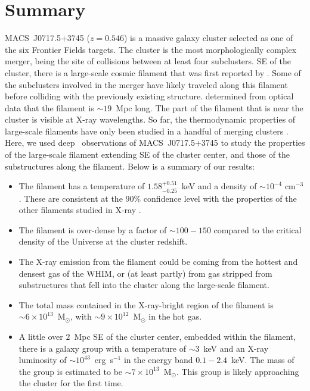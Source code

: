 \section{Summary}
\label{sec:Summary}

MACS~J0717.5+3745 ($z=0.546$) is a massive galaxy cluster selected as one of the six Frontier Fields targets. The cluster is the most morphologically complex merger, being the site of collisions between at least four subclusters. SE of the cluster, there is a large-scale cosmic filament that was first reported by \citet{Ebeling2004}. Some of the subclusters involved in the merger have likely traveled along this filament before colliding with the previously existing structure. \citet{Jauzac2012} determined from optical data that the filament is $\sim 19$~Mpc long. The part of the filament that is near the cluster is visible at X-ray wavelengths. So far, the thermodynamic properties of large-scale filaments have only been studied in a handful of merging clusters \citep{Werner2008, Eckert2015, Bulbul2016}. Here, we used deep \chandra\ observations of MACS~J0717.5+3745 to study the properties of the large-scale filament extending SE of the cluster center, and those of the substructures along the filament. Below is a summary of our results:

\begin{itemize}
	\item The filament has a temperature of $1.58_{-0.25}^{+0.51}$~keV and a density of $\sim 10^{-4}$ cm$^{-3}$. These are consistent at the $90\%$ confidence level with the properties of the other filaments studied in X-ray \citep{Werner2008, Eckert2015, Bulbul2016}.
	\item The filament is over-dense by a factor of $\sim 100-150$ compared to the critical density of the Universe at the cluster redshift.
	\item The X-ray emission from the filament could be coming from the hottest and densest gas of the WHIM, or (at least partly) from gas stripped from substructures that fell into the cluster along the large-scale filament.
	\item The total mass contained in the X-ray-bright region of the filament is $\sim 6\times 10^{13}$~M$_\odot$, with $\sim 9\times 10^{12}$~M$_\odot$ in the hot gas.
	\item A little over $2$~Mpc SE of the cluster center, embedded within the filament, there is a galaxy group with a temperature of $\sim 3$~keV and an X-ray luminosity of $\sim 10^{43}$~erg~s$^{-1}$ in the energy band $0.1 - 2.4$~keV. The mass of the group is estimated to be $\sim 7\times 10^{13}$~M$_\odot$. This group is likely approaching the cluster for the first time.
\end{itemize}

